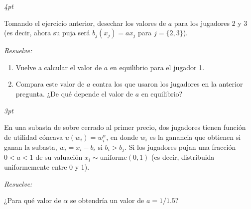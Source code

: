\documentclass[12pt]{scrartcl} %
\begin{document}
\begin{Exercise}[name=Pregunta]
  \textit{4pt}

Tomando el ejercicio anterior, desechar los valores de $ a $ para los jugadores 2 y 3 (es decir, ahora su puja será $ b_j(x_j)=ax_j $ para $ j=\{2, 3\} $).  

\textit{Resuelve:}

\begin{enumerate}
\setlength{\itemsep}{0pt}
\setlength{\parskip}{0pt}
\setlength{\parsep}{0pt}
  \item Vuelve a calcular el valor de $ a $ en equilibrio para el jugador 1.
  \item Compara este valor de $ a $ contra los que usaron los jugadores en la anterior pregunta. ¿De qué depende el valor de $ a $ en equilibrio?
\end{enumerate}
  
\end{Exercise}

\begin{Exercise}[name=Pregunta]
  \textit{3pt}

  En una subasta de sobre cerrado al primer precio, dos jugadores tienen función de utilidad cóncava $ u(w_i)=w_i^\alpha $, en donde $ w_i $ es la ganancia que obtienen si ganan la subasta, $ w_i = x_i - b_i $ si $ b_i > b_j $. Si los jugadores pujan una fracción $0 < a < 1$ de su valuación $ x_i \sim \text{uniforme} (0, 1) $ (es decir, distribuida uniformemente entre 0 y 1).

  \textit{Resuelve:}

  ¿Para qué valor de $ \alpha $ se obtendría un valor de $ a = 1/1.5 $?
  
\end{Exercise}
\end{document}
